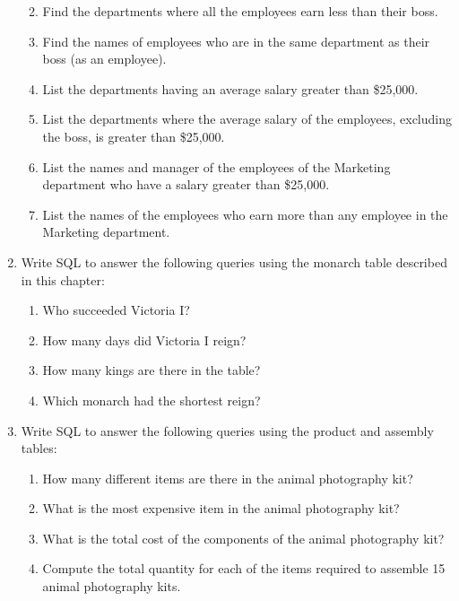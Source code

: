 \documentclass[
]{article}
\begin{document}
\begin{enumerate}
  \begin{enumerate}
  \def\labelenumii{\alph{enumii}.}
  \item
    Find the departments where all the employees earn less than
    their boss.
  \item
    Find the names of employees who are in the same department as
    their boss (as an employee).
  \item
    List the departments having an average salary greater than
    \$25,000.
  \item
    List the departments where the average salary of the employees,
    excluding the boss, is greater than \$25,000.
  \item
    List the names and manager of the employees of the Marketing
    department who have a salary greater than \$25,000.
  \item
    List the names of the employees who earn more than any employee
    in the Marketing department.
  \end{enumerate}
\item
  Write SQL to answer the following queries using the monarch table
  described in this chapter:

  \begin{enumerate}
  \def\labelenumii{\alph{enumii}.}
  \item
    Who succeeded Victoria I?
  \item
    How many days did Victoria I reign?
  \item
    How many kings are there in the table?
  \item
    Which monarch had the shortest reign?
  \end{enumerate}
\item
  Write SQL to answer the following queries using the product and
  assembly tables:

  \begin{enumerate}
  \def\labelenumii{\alph{enumii}.}
  \item
    How many different items are there in the animal photography
    kit?
  \item
    What is the most expensive item in the animal photography kit?
  \item
    What is the total cost of the components of the animal
    photography kit?
  \item
    Compute the total quantity for each of the items required to
    assemble 15 animal photography kits.
  \end{enumerate}
\end{enumerate}
\end{document}

